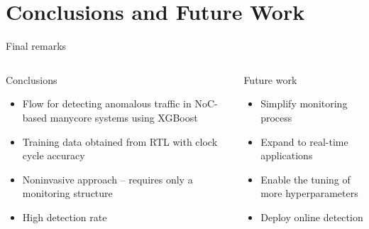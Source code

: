 \section{Conclusions and Future Work}

\begin{frame}{Final remarks}
    \begin{columns}
        \begin{block}{Conclusions}
            \begin{itemize}
                \item Flow for detecting anomalous traffic in NoC-based manycore systems using XGBoost
                \item Training data obtained from RTL with clock cycle accuracy
                \item Noninvasive approach -- requires only a monitoring structure
                \item High detection rate
            \end{itemize}
        \end{block}

        \begin{block}{Future work}
            \begin{itemize}
                \item Simplify monitoring process
                \item Expand to real-time applications
                \item Enable the tuning of more hyperparameters
                \item Deploy online detection
            \end{itemize}
        \end{block}
    \end{columns}
\end{frame}

